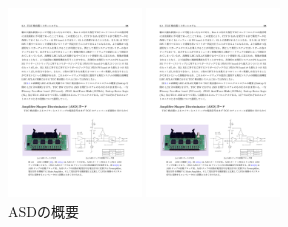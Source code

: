 \begin{figure}
\begin{minipage}[b]{.5\linewidth}
\centering
\includegraphics[height=5cm]{fig/Intro/TGC_ASD.pdf}
\end{minipage}%
\begin{minipage}[b]{.5\linewidth}
\centering
\includegraphics[height=5cm]{fig/Intro/TGC_ASDcircuite.pdf}
\end{minipage}%
\caption[ASDの概要]{ASDの概要\cite{ASD}}
\label{TGC_ASD}
\end{figure}

